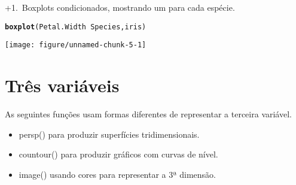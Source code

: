 \documentclass{article}\usepackage[]{graphicx}\usepackage[]{color}
\makeatletter
\def\maxwidth{ %
  \ifdim\Gin@nat@width>\linewidth
    \linewidth
  \else
    \Gin@nat@width
  \fi
}
\newcommand{\hlopt}[1]{\textcolor[rgb]{0,0,0}{#1}}%
\newcommand{\hlstd}[1]{\textcolor[rgb]{0.345,0.345,0.345}{#1}}%
\newcommand{\hlkwd}[1]{\textcolor[rgb]{0.737,0.353,0.396}{\textbf{#1}}}%
\newenvironment{kframe}{%
 \def\at@end@of@kframe{}%
 \ifinner\ifhmode%
  \def\at@end@of@kframe{\end{minipage}}%
  \begin{minipage}{\columnwidth}%
 \fi\fi%
 \def\FrameCommand##1{\hskip\@totalleftmargin \hskip-\fboxsep
 \colorbox{shadecolor}{##1}\hskip-\fboxsep
     \hskip-\linewidth \hskip-\@totalleftmargin \hskip\columnwidth}%
 \MakeFramed {\advance\hsize-\width
   \@totalleftmargin\z@ \linewidth\hsize
   \@setminipage}}%
 {\par\unskip\endMakeFramed%
 \at@end@of@kframe}
\newenvironment{knitrout}{}{} %
\newcounter{graph}[section]
\renewcommand{\thegraph}{\number\numexpr\value{graph}+1\relax.~\stepcounter{graph}}
\makeatother
\begin{document}
\pagebreak
\thegraph Boxplots condicionados, mostrando um para cada espécie.
\begin{knitrout}
\color{fgcolor}\begin{kframe}
\begin{alltt}
\hlkwd{boxplot}\hlstd{(Petal.Width} \hlopt{~} \hlstd{Species, iris)}
\end{alltt}
\end{kframe}
\texttt{[image: figure/unnamed-chunk-5-1]} 

\end{knitrout}

\pagebreak
\section{Três variáveis}
As seguintes funções usam formas diferentes de representar a terceira variável.
\begin{itemize}
\item persp() para produzir superfícies tridimensionais.
\item countour() para produzir gráficos com curvas de nível.
\item image() usando cores para representar a 3ª dimensão.
\end{itemize}
\end{document}
